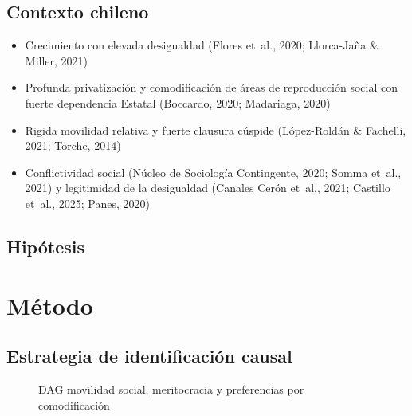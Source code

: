 \documentclass[
  spanish,
  letterpaper,
  DIV=11,
  numbers=noendperiod,
  oneside]{scrartcl}
\providecommand{\tightlist}{%
  \setlength{\itemsep}{0pt}\setlength{\parskip}{0pt}}
\begin{document}
\subsection{Contexto chileno}\label{contexto-chileno}

\begin{itemize}
\tightlist
\item
  Crecimiento con elevada desigualdad (Flores et~al., 2020; Llorca-Jaña
  \& Miller, 2021)
\item
  Profunda privatización y comodificación de áreas de reproducción
  social con fuerte dependencia Estatal (Boccardo, 2020; Madariaga,
  2020)
\item
  Rigida movilidad relativa y fuerte clausura cúspide (López-Roldán \&
  Fachelli, 2021; Torche, 2014)
\item
  Conflictividad social (Núcleo de Sociología Contingente, 2020; Somma
  et~al., 2021) y legitimidad de la desigualdad (Canales Cerón et~al.,
  2021; Castillo et~al., 2025; Panes, 2020)
\end{itemize}

\subsection{Hipótesis}\label{hipuxf3tesis}

\section{Método}\label{muxe9todo}

\subsection{Estrategia de identificación
causal}\label{estrategia-de-identificaciuxf3n-causal}

\begin{figure}

\caption{\label{fig-dag}DAG movilidad social, meritocracia y
preferencias por comodificación}


\end{figure}%
\end{document}
